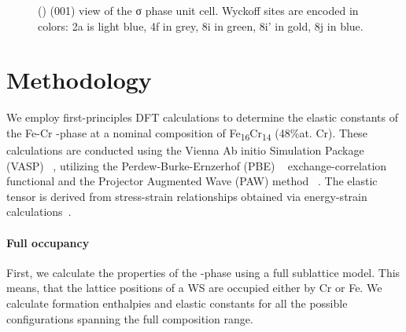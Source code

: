 \documentclass[superscriptaddress, 12pt]{revtex4-2}%
\begin{document}
\begin{figure}
  \caption{\protect\label{fig:introduction}
    () (001) view of the σ phase unit cell.
    Wyckoff sites are encoded in colors: 2a is light blue,
    4f in grey, 8i in green, 8i' in gold, 8j in blue.
  }
\end{figure}

\section{Methodology}

We employ first-principles DFT calculations to determine the elastic constants of the Fe-Cr \textsigma-phase at a nominal composition of Fe\textsubscript{16}Cr\textsubscript{14} (48\%at. Cr).
These calculations are conducted using the Vienna Ab initio Simulation Package (VASP) ~\cite{Hafner_vasp}, utilizing the Perdew-Burke-Ernzerhof (PBE) ~\cite{Perdew1996} exchange-correlation functional and the Projector Augmented Wave (PAW) method ~\cite{Bloch1994, kresse_ultrasoft_1999}.
The elastic tensor is derived from stress-strain relationships obtained via energy-strain calculations~\cite{golesorkhtabar_elastic_2013}.


\paragraph{Full occupancy}

First, we calculate the properties of the \textsigma-phase using a full sublattice model.
This means, that the lattice positions of a WS are occupied either by Cr or Fe.
We calculate formation enthalpies and elastic constants for all the possible configurations spanning the full composition range.
\end{document}
